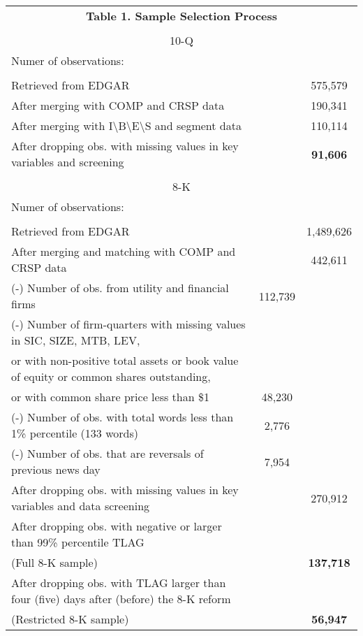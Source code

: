 \begin{table}[htbp] \label{T1}
  \centering
    \begin{tabular}{lcc}
    \multicolumn{3}{c}{\textbf{Table 1. Sample Selection Process}} \\ 
      & &  \\
    \multicolumn{3}{c}{10-Q} \\
    Numer of observations: &  &\\
      & &  \\
    Retrieved from EDGAR & & 575,579 \\
    After merging with COMP and CRSP data & & 190,341 \\
    After merging with I\textbackslash{}B\textbackslash{}E\textbackslash{}S and segment data & & 110,114 \\
    After dropping obs. with missing values in key variables and screening & & \textbf{91,606} \\
      & &  \\
    \multicolumn{3}{c}{8-K} \\
    Numer of observations: & &  \\
      & &  \\
    Retrieved from EDGAR & & 1,489,626 \\
    After merging and matching with COMP and CRSP data  & & 442,611 \\
    (-) Number of obs. from utility and financial firms & 112,739 & \\
    (-) Number of firm-quarters with missing values in SIC, SIZE, MTB, LEV, & & \\
    \hspace{5mm}or with non-positive total assets or book value of equity or common shares outstanding, & & \\
    \hspace{5mm}or with common share price less than \$1 & 48,230 & \\
    (-) Number of obs. with total words less than 1\% percentile (133 words) & 2,776 & \\
    (-) Number of obs. that are reversals of previous news day & 7,954 & \\
    \bottomrule
    After dropping obs. with missing values in key variables and data screening  & & 270,912 \\
    After dropping obs. with negative or larger than 99\% percentile TLAG &  &  \\
    (Full 8-K sample)& & \textbf{137,718} \\
    After dropping obs. with TLAG larger than four (five) days after (before) the 8-K reform &  & \\
    (Restricted 8-K sample) &  & \textbf{56,947} 
    \end{tabular}%
\end{table}%
